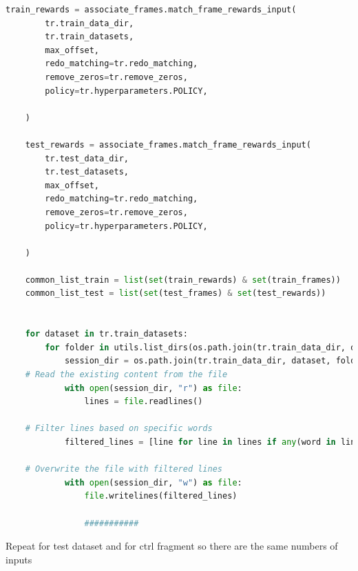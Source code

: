\documentclass[12pt]{report}
\begin{document}
\begin{lstlisting}[language=Python]
    train_rewards = associate_frames.match_frame_rewards_input(
        tr.train_data_dir,
        tr.train_datasets,
        max_offset,
        redo_matching=tr.redo_matching,
        remove_zeros=tr.remove_zeros,
        policy=tr.hyperparameters.POLICY,
        
    )

    test_rewards = associate_frames.match_frame_rewards_input(
        tr.test_data_dir,
        tr.test_datasets,
        max_offset,
        redo_matching=tr.redo_matching,
        remove_zeros=tr.remove_zeros,
        policy=tr.hyperparameters.POLICY,
        
    )

    common_list_train = list(set(train_rewards) & set(train_frames))
    common_list_test = list(set(test_frames) & set(test_rewards))
    

    for dataset in tr.train_datasets:
        for folder in utils.list_dirs(os.path.join(tr.train_data_dir, dataset)):
            session_dir = os.path.join(tr.train_data_dir, dataset, folder, "reward_data", "matched_frame_reward_processed.txt")
    # Read the existing content from the file
            with open(session_dir, "r") as file:
                lines = file.readlines()

    # Filter lines based on specific words
            filtered_lines = [line for line in lines if any(word in line for word in common_list_train)]

    # Overwrite the file with filtered lines
            with open(session_dir, "w") as file:
                file.writelines(filtered_lines)

                ###########    
\end{lstlisting}

Repeat for test dataset and for ctrl fragment so there are the same numbers of inputs

\newpage

\end{document}
